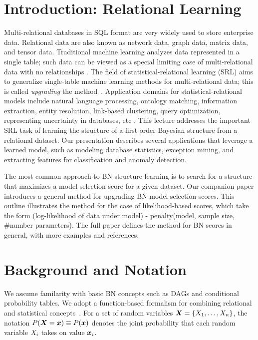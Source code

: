 \documentclass{article}
\begin{document}
\section{Introduction: Relational Learning}
Multi-relational databases in SQL format are very widely used to store enterprise data. Relational data are also known as network data, graph data, matrix data, and tensor data. Traditional machine learning analyzes  data represented in a single table; such data can be viewed as a special limiting case of multi-relational data with no relationships \cite{Nickel2016}. The field of statistical-relational learning (SRL)
aims to generalize single-table machine learning methods for multi-relational data; this is called {\em upgrading} the method~\cite{SRL2007,Ch.10deraedt}. Application domains for statistical-relational models include natural language processing, 
ontology matching, information extraction, entity resolution, link-based clustering, query optimization, representing uncertainty in databases, etc 
\cite{Domingos2007,Niu2011,Getoor2001,Wang2008}. This lecture addresses the important SRL task of learning the structure of a first-order Bayesian  structure from a relational dataset. Our presentation describes several applications that leverage a learned model, such as modeling database statistics, exception mining, and extracting features for classification and anomaly detection. 

 
The most common approach to BN structure learning is to search for a structure that maximizes a model selection score for a given dataset. Our companion paper \cite{Schulte2017a} introduces a general method for upgrading BN model selection scores. 
%
This outline illustrates the method for the case of likelihood-based scores, which take the form (log-likelihood of data under model) - penalty(model, sample size, \#number parameters). %
The full paper defines the method for BN scores in general, with more examples and references.

\section{Background and Notation} 
We assume familarity with basic BN concepts such as DAGs and conditional probability tables.
We adopt  
a function-based  formalism for combining relational and statistical concepts~\cite{Poole2003,Russell2015}. For a set of random variables $\boldsymbol{X} = \{X_{1},\ldots,X_{n}\}$, 
the  notation $P(\boldsymbol{X} = \boldsymbol{x}) \equiv P(\boldsymbol{x})$ denotes the joint probability that each random variable $X_{i}$ takes on value $\boldsymbol{x}_{i}$. 
\end{document}
